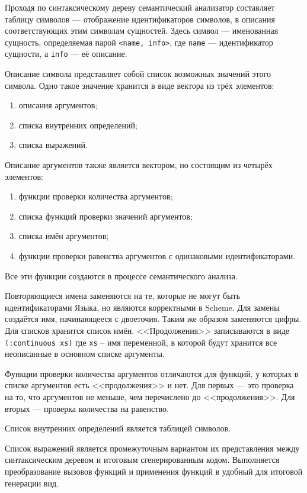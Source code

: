     Проходя по синтаксическому дереву семантический анализатор составляет таблицу символов --- отображение идентификаторов символов, в описания соответствующих этим символам сущностей\cite{skor}.
    Здесь символ --- именованная сущность, определяемая парой \verb!<name, info>!, где \verb,name, --- идентификатор сущности, а \verb,info, --- её описание.

    Описание символа представляет собой список возможных значений этого символа.
    Одно такое значение хранится в виде вектора из трёх элементов:
    \begin{enumerate}
        \item описания аргументов;
        \item списка внутренних определений;
        \item списка выражений.
    \end{enumerate}

    Описание аргументов также является вектором, но состоящим из четырёх элементов:
    \begin{enumerate}
        \item функции проверки количества аргументов;
        \item списка функций проверки значений аргументов;
        \item списка имён аргументов;
        \item функции проверки равенства аргументов с одинаковыми идентификаторами.
    \end{enumerate}
    Все эти функции создаются в процессе семантического анализа.

    Повторяющиеся имена заменяются на те, которые не могут быть идентификаторами Языка, но являются корректными в Scheme.
    Для замены создаётся имя, начинающееся с двоеточия.
    Таким же образом заменяются цифры.
    Для списков хранится список имён.
    <<Продолжения>> записываются в виде \verb,(:continuous xs), где \verb/xs/ -- имя переменной, в которой будут хранится все неописанные в основном списке аргументы.

    Функции проверки количества аргументов отличаются для функций, у которых в списке аргументов есть <<продолжения>> и нет.
    Для первых --- это проверка на то, что аргументов не меньше, чем перечислено до <<продолжения>>.
    Для вторых --- проверка количества на равенство.

    Список внутренних определений является таблицей символов.

    Список выражений является промежуточным вариантом их представления между синтаксическим деревом и итоговым сгенерированным кодом.
    Выполняется преобразование вызовов функций и применения функций в удобный для итоговой генерации вид.

